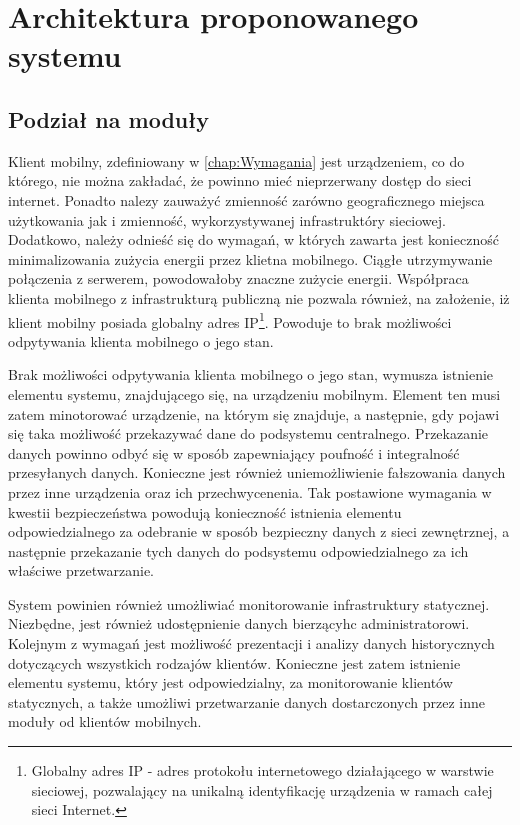 \chapter{Architektura proponowanego systemu}
\label{chap:ArchCal}

\section[Podział na moduły][Podział na moduły]{Podział na moduły}

Klient mobilny, zdefiniowany w \ref{chap:Wymagania} jest urządzeniem,
co do którego, nie można zakładać, że powinno mieć nieprzerwany dostęp
do sieci internet. Ponadto nalezy zauważyć zmienność zarówno
geograficznego miejsca użytkowania jak i zmienność, wykorzystywanej
infrastruktóry sieciowej. Dodatkowo, należy odnieść się do wymagań, w
których zawarta jest konieczność minimalizowania zużycia energii przez
klietna mobilnego. Ciągłe utrzymywanie połączenia z serwerem,
powodowałoby znaczne zużycie energii. Współpraca klienta mobilnego z
infrastrukturą publiczną nie pozwala również, na założenie, iż klient
mobilny posiada globalny adres IP\footnote{Globalny adres IP - adres
  protokołu internetowego działającego w warstwie sieciowej,
  pozwalający na unikalną identyfikację urządzenia w ramach całej
  sieci Internet.}. Powoduje to brak możliwości odpytywania klienta
mobilnego o jego stan.

Brak możliwości odpytywania klienta mobilnego o jego stan, wymusza
istnienie elementu systemu, znajdującego się, na urządzeniu
mobilnym. Element ten musi zatem minotorować urządzenie, na którym się
znajduje, a następnie, gdy pojawi się taka możliwość przekazywać dane
do podsystemu centralnego. Przekazanie danych powinno odbyć się w
sposób zapewniający poufność i integralność przesyłanych
danych. Konieczne jest również uniemożliwienie fałszowania danych
przez inne urządzenia oraz ich przechwycenenia. Tak postawione
wymagania w kwestii bezpieczeństwa powodują konieczność istnienia
elementu odpowiedzialnego za odebranie w sposób bezpieczny danych z
sieci zewnętrznej, a następnie przekazanie tych danych do podsystemu
odpowiedzialnego za ich właściwe przetwarzanie.

System powinien również umożliwiać monitorowanie infrastruktury
statycznej. Niezbędne, jest również udostępnienie danych bierzącyhc
administratorowi. Kolejnym z wymagań jest możliwość prezentacji i
analizy danych historycznych dotyczących wszystkich rodzajów
klientów. Konieczne jest zatem istnienie elementu systemu, który jest
odpowiedzialny, za monitorowanie klientów statycznych, a także
umożliwi przetwarzanie danych dostarczonych przez inne moduły od
klientów mobilnych. 


